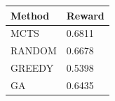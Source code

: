 \begin{tabular}{ll}
\hline
Method & Reward \\
\hline
  MCTS & 0.6811 \\
  RANDOM & 0.6678 \\
  GREEDY & 0.5398 \\
  GA & 0.6435 \\
\hline
\end{tabular}
